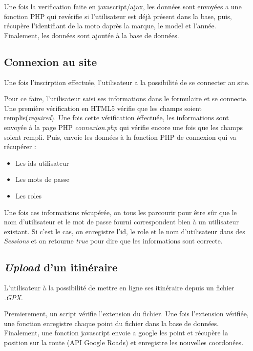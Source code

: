 \documentclass[a4paper]{article}
\newcommand{\bdd}{base de données}
\newcommand{\diag}[1]{}
\begin{document}
Une fois la verification faite en javascript/ajax, les données sont envoyées a une fonction PHP qui revérifie si l'utilisateur est déjà présent dans la base, puis, récupère l'identifiant de la moto daprès la marque, le model et l'année.
Finalement, les données sont ajoutée à la base de données.
\begin{center}
	 \diag{Inscription}
\end{center}




\subsection{Connexion au site}
Une fois l'inscirption effectuée, l'utilisateur a la possibilité de se connecter au site.

Pour ce faire, l'utilisateur saisi ses informations dans le formulaire et se connecte.
Une première vérification en HTML5 vérifie que les champs soient remplis(\emph{required}).
Une fois cette vérification éffectuée, les informations sont envoyée à la page PHP \emph{connexion.php} qui vérifie encore une fois que les champs soient rempli. Puis, envoie les données à la fonction PHP de connexion qui va récupérer :
\begin{itemize}
	\item Les ids utilisateur
	\item Les mots de passe
	\item Les roles
\end{itemize}

Une fois ces informations récupérée, on tous les parcourir pour être sûr que le nom d'utilisateur et le mot de passe fourni correspondent bien à un utilisateur existant.
Si c'est le cas, on enregistre l'id, le role et le nom d'utilisateur dans des \emph{Sessions} et on retourne \emph{true} pour dire que les informations sont correcte.

\begin{center}
	\diag{Connexion}
\end{center}

\subsection{\emph{Upload} d'un itinéraire}
L'utilisateur à la possibilité de mettre en ligne ses itinéraire depuis un fichier \emph{.GPX}.

Premierement, un script vérifie l'extension du fichier. Une fois l'extension vérifiée, une fonction enregistre chaque point du fichier dans la \bdd. Finalement, une fonction javascript envoie a google les point et récupère la position sur la route (API Google Roads) et enregistre les nouvelles coordonées.
\end{document}
